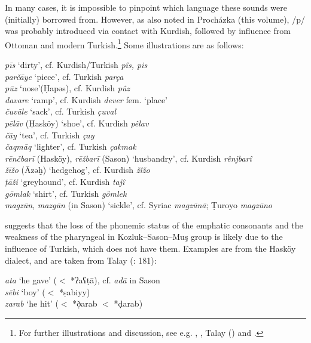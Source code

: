 \documentclass[output=paper]{langsci/langscibook}
\begin{document}
In many cases, it is impossible to pinpoint which language these sounds were (initially) borrowed from. However, as also noted in Proch\'{a}zka (this volume), /p/ was probably introduced via contact with Kurdish, followed by influence from Ottoman and modern Turkish.\footnote{For further illustrations and discussion, see e.g. \citet{VockeWaldner1982}, \citet{Jastrow2011anatolian}, Talay (\citeyear{Talay2002,Talay2007}) and \citet{GrigoreBituna2012}.} Some illustrations are as follows:

\ea 
\noindent \textit{p\={i}s} `dirty', cf. Kurdish/Turkish \textit{p\^{i}s, pis}\\
\textit{par\v{c}\={a}ye} `piece', cf. Turkish \textit{par\c{c}a}\\
\textit{p\={u}z} `nose'(\d{H}apəs), cf. Kurdish \textit{p\^{u}z}\\ 
\textit{davare} `ramp', cf. Kurdish \textit{dever} fem. `place'\\
\textit{\v{c}uv\={a}le} `sack', cf. Turkish \textit{\c{c}uval} \\
\textit{pēlāv} (\d{H}ask\"{o}y) `shoe', cf. Kurdish \textit{p\^{e}lav}\\
\textit{\v{c}\={a}y} `tea', cf. Turkish \textit{\c{c}ay}\\
\textit{\v{c}aqm\={a}q} `lighter', cf. Turkish \textit{\c{c}akmak}\\
\textit{rēnčbarī} (Hasköy), \textit{rē\v{z}barī} (Sason) `husbandry', cf. Kurdish \textit{rênjbarî}\\
\textit{žīžo} (Āzəḫ) `hedgehog', cf. Kurdish \textit{žîžo} \\
\textit{ṭāži} `greyhound', cf. Kurdish \textit{tajî} \\
\textit{g\={o}mlak} `shirt', cf. Turkish \textit{g\"{o}mlek}\\
\textit{magz\={u}n}, \textit{mazg\={u}n} (in Sason) `sickle', cf. Syriac \textit{magz\={u}n\={a}}; \d{T}uroyo \textit{magz\={u}no}\\
\z

\cite{Talay2007} suggests that the loss of the phonemic status of the emphatic consonants and the weakness of the pharyngeal in Kozluk--Sason--Mu\c{s} group is likely due to the influence of Turkish, which does not have them. Examples are from the Hask\"{o}y dialect, and are taken from Talay (\citeyear{Talay2007}: 181):

\ea
\noindent \textit{ata} `he gave' ($<$ *ʔaʕ\d{t}ā), cf. \textit{ad\={a}} in Sason\\
\textit{sēbi} `boy' ($<$ *\d{s}abiyy)\\
\textit{zarab} `he hit' ($<$ *\d{ð}arab $<$ *\d{d}arab)\\
\z
\end{document}
